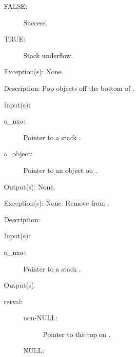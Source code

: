 \begin{capi}
\begin{capilist}
\begin{description}
			\begin{description}\item[]
			\item[FALSE: ]
				Success.
			\item[TRUE: ]
				Stack underflow.
			\end{description}
		\end{description}
	\item[Exception(s): ] None.
	\item[Description: ]
		Pop  objects off the bottom of .
	\end{capilist}
\label{nxo_stack_remove}
	\begin{capilist}
	\item[Input(s): ]
		\begin{description}\item[]
		\item[a\_nxo: ]
			Pointer to a stack .
		\item[a\_object: ]
			Pointer to an object on .
		\end{description}
	\item[Output(s): ] None.
	\item[Exception(s): ] None.
		Remove  from .
	\item[Description: ]
	\end{capilist}
\label{nxo_stack_get}
	\begin{capilist}
	\item[Input(s): ]
		\begin{description}\item[]
		\item[a\_nxo: ]
			Pointer to a stack \classname{nxo}.
		\end{description}
	\item[Output(s): ]
		\begin{description}\item[]
		\item[retval: ]
			\begin{description}\item[]
			\item[non-NULL: ]
				Pointer to the top \classname{nxo} on
				\cvar{a\_nxo}.
			\item[NULL: ]

\end{description}
\end{description}
\end{capilist}
\end{capi}
